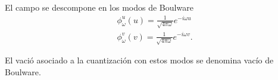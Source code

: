 El campo se descompone en los modos de Boulware
\begin{equation}
  \begin{aligned}
    \phi_\omega^u(u)=\frac{1}{\sqrt{4\pi \omega}}e^{-i\omega u}\\
    \phi_\omega^v(v)=\frac{1}{\sqrt{4\pi \omega}}e^{-i\omega v}.
  \end{aligned}
\end{equation}

El vació asociado a la cuantización con estos modos se denomina vacío de Boulware.









